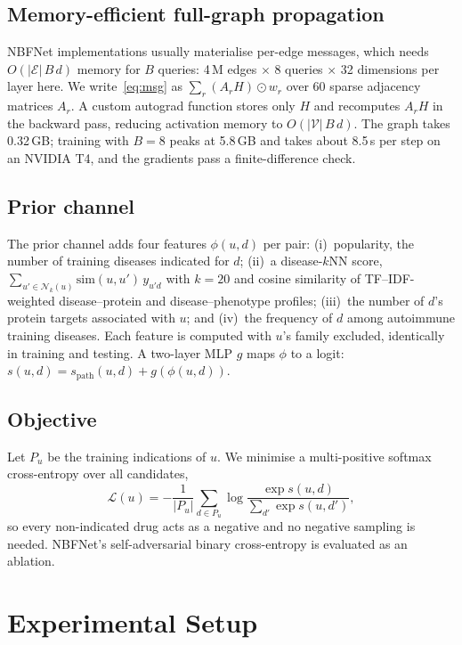 \documentclass[journal]{IEEEtran}
\begin{document}
\subsection{Memory-efficient full-graph propagation}
NBFNet implementations usually materialise per-edge messages, which needs $O(|\mathcal{E}|\,B\,d)$ memory for $B$ queries: 4\,M edges $\times$ 8 queries $\times$ 32 dimensions per layer here. We write~\eqref{eq:msg} as $\sum_r (A_r H)\odot w_r$ over 60 sparse adjacency matrices $A_r$. A custom autograd function stores only $H$ and recomputes $A_r H$ in the backward pass, reducing activation memory to $O(|\mathcal{V}|\,B\,d)$. The graph takes 0.32\,GB; training with $B=8$ peaks at 5.8\,GB and takes about 8.5\,s per step on an NVIDIA T4, and the gradients pass a finite-difference check.

\subsection{Prior channel}
The prior channel adds four features $\phi(u,d)$ per pair: (i)~popularity, the number of training diseases indicated for $d$; (ii)~a disease-$k$NN score, $\sum_{u'\in\mathcal{N}_k(u)}\mathrm{sim}(u,u')\,y_{u'd}$ with $k=20$ and cosine similarity of TF--IDF-weighted disease--protein and disease--phenotype profiles; (iii)~the number of $d$'s protein targets associated with $u$; and (iv)~the frequency of $d$ among autoimmune training diseases. Each feature is computed with $u$'s family excluded, identically in training and testing. A two-layer MLP $g$ maps $\phi$ to a logit: $s(u,d)=s_\text{path}(u,d)+g(\phi(u,d))$.

\subsection{Objective}
Let $P_u$ be the training indications of $u$. We minimise a multi-positive softmax cross-entropy over all candidates,
\begin{equation}
\mathcal{L}(u)=-\frac{1}{|P_u|}\sum_{d\in P_u}\log\frac{\exp s(u,d)}{\sum_{d'}\exp s(u,d')},
\end{equation}
so every non-indicated drug acts as a negative and no negative sampling is needed. NBFNet's self-adversarial binary cross-entropy is evaluated as an ablation.

\section{Experimental Setup}
\label{sec:setup}
\end{document}

